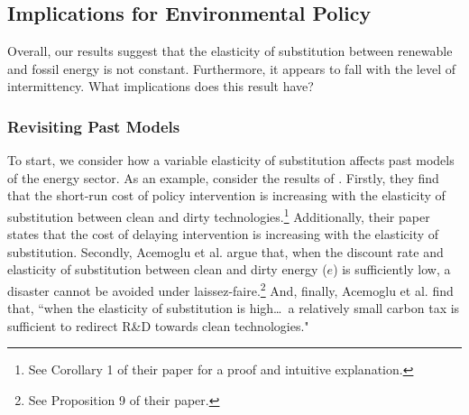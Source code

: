 \documentclass[11pt,a4paper]{extarticle}
\begin{document}






 
\subsection{Implications for Environmental Policy}

Overall, our results suggest that the elasticity of substitution between  renewable and fossil energy is not constant. Furthermore, it appears to fall with the level of intermittency. What implications does this result have?

\subsubsection{Revisiting Past Models}

To start, we consider how  a variable elasticity of substitution affects past models of the energy sector. As an example, consider the results of \citet{Ace2012}. Firstly, they find that the short-run cost of policy intervention is increasing with the elasticity of substitution between clean and dirty technologies.\footnote{ See Corollary 1 of their paper for a proof and intuitive explanation.} Additionally, their paper states that the cost of delaying intervention is increasing with the elasticity of substitution. Secondly, Acemoglu et al. argue that, when the discount rate and elasticity of substitution between clean and dirty energy ($e$) is sufficiently low, a disaster cannot be avoided under laissez-faire.\footnote{ See Proposition 9 of their paper.} And, finally, Acemoglu et al. find that, ``when the elasticity of substitution is high\dots\, a relatively small carbon tax is sufficient to redirect R\&D towards clean technologies."
\end{document}
